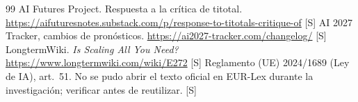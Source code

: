 \documentclass[10pt]{article}
\newcommand{\tS}{\textsf{\small[S]}}
\begin{document}
\begin{thebibliography}{99}
 AI Futures Project. Respuesta a la cr\'itica de titotal. \url{https://aifuturesnotes.substack.com/p/response-to-titotals-critique-of} \tS
{} AI 2027 Tracker, cambios de pron\'osticos. \url{https://ai2027-tracker.com/changelog/} \tS
{} LongtermWiki. \emph{Is Scaling All You Need?} \url{https://www.longtermwiki.com/wiki/E272} \tS
{} Reglamento (UE) 2024/1689 (Ley de IA), art.~51. No se pudo abrir el texto oficial en EUR-Lex durante la investigaci\'on; verificar antes de reutilizar. \tS
\end{thebibliography}
\end{document}
